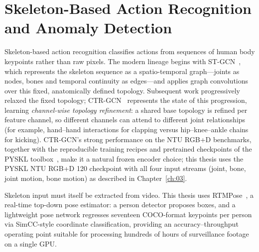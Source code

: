 \section{Skeleton-Based Action Recognition and Anomaly Detection}
\label{sec:rw-skeleton}

Skeleton-based action recognition classifies actions from sequences of human body keypoints
rather than raw pixels. The modern lineage begins with ST-GCN~\cite{yan2018stgcn}, which
represents the skeleton sequence as a spatio-temporal graph---joints as nodes, bones and temporal
continuity as edges---and applies graph convolutions over this fixed, anatomically defined
topology. Subsequent work progressively relaxed the fixed topology; CTR-GCN~\cite{chen2021ctrgcn}
represents the state of this progression, learning \emph{channel-wise topology refinement}: a
shared base topology is refined per feature channel, so different channels can attend to
different joint relationships (for example, hand--hand interactions for clapping versus
hip--knee--ankle chains for kicking). CTR-GCN's strong performance on the NTU RGB+D benchmarks,
together with the reproducible training recipes and pretrained checkpoints of the PYSKL
toolbox~\cite{yan2022pyskl}, make it a natural frozen encoder choice; this thesis uses the PYSKL
NTU RGB+D 120 checkpoint with all four input streams (joint, bone, joint motion, bone motion) as
described in Chapter~\ref{ch:03}.

Skeleton input must itself be extracted from video. This thesis uses
RTMPose~\cite{jiang2023rtmpose}, a real-time top-down pose estimator: a person detector proposes
boxes, and a lightweight pose network regresses seventeen COCO-format keypoints per person via
SimCC-style coordinate classification, providing an accuracy--throughput operating point suitable
for processing hundreds of hours of surveillance footage on a single GPU.

